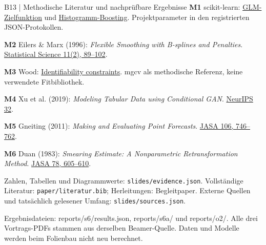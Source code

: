 \documentclass[aspectratio=169,11pt]{beamer}
\newcommand{\source}[1]{\vfill{\fontsize{6.5}{7.4}\selectfont\color{muted}#1\par}}
\newcommand{\smalltext}{\fontsize{9}{11.3}\selectfont}
\begin{document}
\begin{frame}[t]{B13 | Methodische Literatur und nachprüfbare Ergebnisse}
\smalltext
\textbf{M1} scikit-learn: \href{https://scikit-learn.org/1.9/modules/linear_model.html}{GLM-Zielfunktion}
und \href{https://scikit-learn.org/1.9/modules/generated/sklearn.ensemble.HistGradientBoostingRegressor.html}{Histogramm-Boosting}.
Projektparameter in den registrierten JSON-Protokollen.\par\medskip
\textbf{M2} Eilers \& Marx (1996): \emph{Flexible Smoothing with B-splines and Penalties}.
\href{https://doi.org/10.1214/ss/1038425655}{Statistical Science 11(2), 89--102}.\par\smallskip
\textbf{M3} Wood: \href{https://stat.ethz.ch/R-manual/R-devel/library/mgcv/html/identifiability.html}{Identifiability constraints}.
mgcv als methodische Referenz, keine verwendete Fitbibliothek.\par\medskip
\textbf{M4} Xu et al. (2019): \emph{Modeling Tabular Data using Conditional GAN}.
\href{https://proceedings.neurips.cc/paper_files/paper/2019/file/254ed7d2de3b23ab10936522dd547b78-Paper.pdf}{NeurIPS 32}.\par\smallskip
\textbf{M5} Gneiting (2011): \emph{Making and Evaluating Point Forecasts}.
\href{https://doi.org/10.1198/jasa.2011.r10138}{JASA 106, 746--762}.\par\smallskip
\textbf{M6} Duan (1983): \emph{Smearing Estimate: A Nonparametric Retransformation Method}.
\href{https://doi.org/10.1080/01621459.1983.10478017}{JASA 78, 605--610}.\par\medskip
Zahlen, Tabellen und Diagrammwerte: \texttt{slides/evidence.json}.
Vollständige Literatur: \texttt{paper/literatur.bib}; Herleitungen: Begleitpaper.
Externe Quellen und tatsächlich gelesener Umfang: \texttt{slides/sources.json}.
\source{Ergebnisdateien: reports/s6/results.json, reports/s6a/ und reports/o2/.
Alle drei Vortrags-PDFs stammen aus derselben Beamer-Quelle. Daten und Modelle werden beim Folienbau nicht neu berechnet.}
\end{frame}

\fi
\end{document}

